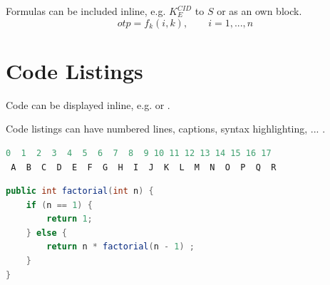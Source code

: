 Formulas can be included inline, e.g. $K_E^{CID}$ to $S$ or as an own block.
$$ otp = f_k(i, k), \qquad i = 1, ..., n $$

\pagebreak
\section{Code Listings}\label{sec:code}

Code can be displayed inline, e.g.  or .

Code listings can have numbered lines, captions, syntax highlighting, ... .

\begin{lstlisting}[caption={[Code Without Line Numbers] Code Without Line Numbers \\ \captionsource{\cite{mus:16}}}, label={lst:codeExample}, language=python, numbers=none]
 0  1  2  3  4  5  6  7  8  9 10 11 12 13 14 15 16 17 
 A  B  C  D  E  F  G  H  I  J  K  L  M  N  O  P  Q  R  
\end{lstlisting}

\begin{lstlisting}[caption={Code With Line Numbers}, label={lst:factorial}, language=Java]
public int factorial(int n) {
	if (n == 1) {
		return 1;
	} else {
		return n * factorial(n - 1) ;
	}
}
\end{lstlisting}







